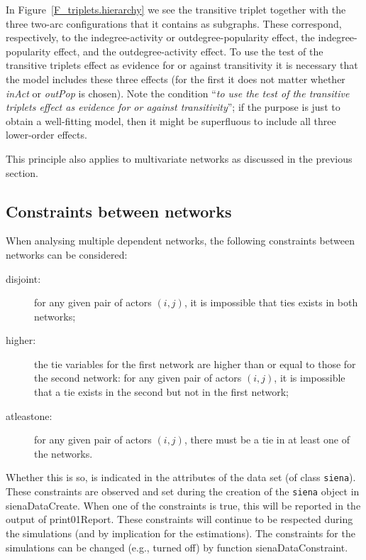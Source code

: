 \documentclass[a4paper,fleqn,11pt]{article}
\newcommand{\+}{\, + \,}
\newcommand{\sfn}[1]{\textsf{#1}}
\begin{document}
In Figure~\ref{F_triplets.hierarchy} we see
the transitive triplet together with the three two-arc
configurations that it contains as subgraphs.
These correspond, respectively, to the indegree-activity
or outdegree-popularity effect, the indegree-popularity effect,
and the outdegree-activity effect.
To use the test of the transitive triplets effect
as evidence for or against transitivity it is necessary
that the model includes these three effects (for the first
it does not matter whether \textit{inAct} or \textit{outPop}
is chosen).
Note the condition ``\textit{to use the test of the transitive triplets effect
as evidence for or against transitivity}'';
if the purpose is just to obtain a well-fitting model,
then it might be superfluous to include all three lower-order effects.

This principle also applies to multivariate networks as discussed
in the previous section.



\subsection{Constraints between networks}
\label{S_constraints}

When analysing multiple dependent networks, the following constraints
between networks can be considered:
\begin{description}
  \item[disjoint:] for any given pair of actors $(i,j)$,
      it is impossible that ties exists in both networks;
  \item[higher:] the tie variables for the first network
      are higher than or equal to those for the second network:
      for any given pair of actors $(i,j)$,
      it is impossible that a tie exists in the second
      but not in the first network;
  \item[atleastone:] for any given pair of actors $(i,j)$,
     there must be a tie in at least one of the networks.
\end{description}
Whether this is so, is indicated in the attributes of the data set
(of class \texttt{siena}).
These constraints are observed and set during the creation of the
\texttt{siena} object in \textsf{sienaDataCreate}.
When one of the constraints is true,
this will be reported in the output of \textsf{print01Report}.
These constraints will continue to be respected during the simulations
(and by implication for the estimations).
The constraints for the simulations can be changed
(e.g., turned off) by function \sfn{sienaDataConstraint}.
\end{document}
